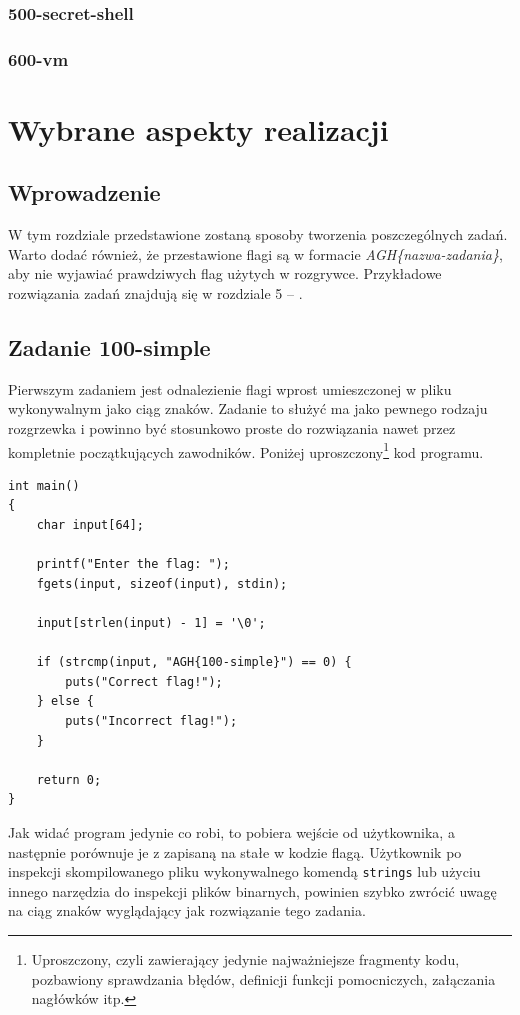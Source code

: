 \documentclass[language=polish,type=eng]{aghmodern}
\begin{document}
\subsection{500-secret-shell}
\subsection{600-vm}

\chapter{Wybrane aspekty realizacji}

\section{Wprowadzenie}

W tym rozdziale przedstawione zostaną sposoby tworzenia poszczególnych zadań.
Warto dodać również, że przestawione flagi są w formacie \emph{AGH\{nazwa-zadania\}},
aby nie wyjawiać prawdziwych flag użytych w rozgrywce.
Przykładowe rozwiązania zadań znajdują się w rozdziale 5 -- .

\section{Zadanie 100-simple}

Pierwszym zadaniem jest odnalezienie flagi wprost umieszczonej
w pliku wykonywalnym jako ciąg znaków.
Zadanie to służyć ma jako pewnego rodzaju rozgrzewka i powinno być stosunkowo
proste do rozwiązania nawet przez kompletnie początkujących zawodników.
Poniżej uproszczony\footnote{Uproszczony, czyli zawierający jedynie
najważniejsze fragmenty kodu, pozbawiony sprawdzania błędów, definicji funkcji
pomocniczych, załączania nagłówków itp.} kod programu.

\begin{verbatim}
int main()
{
    char input[64];

    printf("Enter the flag: ");
    fgets(input, sizeof(input), stdin);

    input[strlen(input) - 1] = '\0';

    if (strcmp(input, "AGH{100-simple}") == 0) {
        puts("Correct flag!");
    } else {
        puts("Incorrect flag!");
    }

    return 0;
}
\end{verbatim}

Jak widać program jedynie co robi, to pobiera wejście od użytkownika, a następnie
porównuje je z zapisaną na stałe w kodzie flagą. Użytkownik po inspekcji skompilowanego
pliku wykonywalnego komendą \texttt{strings} lub użyciu innego narzędzia
do inspekcji plików binarnych, powinien szybko zwrócić uwagę na
ciąg znaków wyglądający jak rozwiązanie tego zadania.
\end{document}
